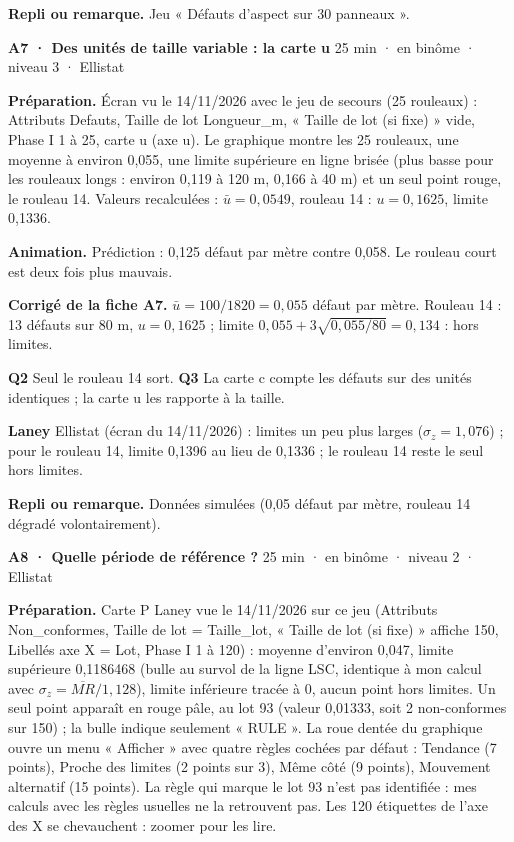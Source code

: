{\small\textbf{Repli ou remarque.} Jeu « Défauts d'aspect sur 30 panneaux ».}\par
\vspace{3pt}
\begin{tcolorbox}[act]\textbf{A7 · Des unités de taille variable : la carte u} \hfill {\small 25 min · en binôme · niveau 3 · Ellistat}\end{tcolorbox}
\textbf{Préparation.} Écran vu le 14/11/2026 avec le jeu de secours (25 rouleaux) : Attributs Defauts, Taille de lot Longueur\_m, « Taille de lot (si fixe) » vide, Phase I 1 à 25, carte u (axe u). Le graphique montre les 25 rouleaux, une moyenne à environ 0,055, une limite supérieure en ligne brisée (plus basse pour les rouleaux longs : environ 0,119 à 120 m, 0,166 à 40 m) et un seul point rouge, le rouleau 14. Valeurs recalculées : $\bar u = 0{,}0549$, rouleau 14 : $u = 0{,}1625$, limite 0,1336.\par
\textbf{Animation.} Prédiction : 0,125 défaut par mètre contre 0,058. Le rouleau court est deux fois plus mauvais.\par
\textbf{\color{ok}Corrigé de la fiche A7.} $\bar u = 100 / 1820 = 0{,}055$ défaut par mètre. Rouleau 14 : 13 défauts sur 80 m, $u = 0{,}1625$ ; limite $0{,}055 + 3\sqrt{0{,}055 / 80} = 0{,}134$ : hors limites.\par \textbf{Q2} Seul le rouleau 14 sort. \textbf{Q3} La carte c compte les défauts sur des unités identiques ; la carte u les rapporte à la taille.\par \textbf{Laney} Ellistat (écran du 14/11/2026) : limites un peu plus larges ($\sigma_z = 1{,}076$) ; pour le rouleau 14, limite 0,1396 au lieu de 0,1336 ; le rouleau 14 reste le seul hors limites.\par
{\small\textbf{Repli ou remarque.} Données simulées (0,05 défaut par mètre, rouleau 14 dégradé volontairement).}\par
\vspace{3pt}
\begin{tcolorbox}[act]\textbf{A8 · Quelle période de référence ?} \hfill {\small 25 min · en binôme · niveau 2 · Ellistat}\end{tcolorbox}
\textbf{Préparation.} Carte P Laney vue le 14/11/2026 sur ce jeu (Attributs Non\_conformes, Taille de lot = Taille\_lot, « Taille de lot (si fixe) » affiche 150, Libellés axe X = Lot, Phase I 1 à 120) : moyenne d'environ 0,047, limite supérieure 0,1186468 (bulle au survol de la ligne LSC, identique à mon calcul avec $\sigma_z = \overline{MR}/1{,}128$), limite inférieure tracée à 0, aucun point hors limites. Un seul point apparaît en rouge pâle, au lot 93 (valeur 0,01333, soit 2 non-conformes sur 150) ; la bulle indique seulement « RULE ». La roue dentée du graphique ouvre un menu « Afficher » avec quatre règles cochées par défaut : Tendance (7 points), Proche des limites (2 points sur 3), Même côté (9 points), Mouvement alternatif (15 points). La règle qui marque le lot 93 n'est pas identifiée : mes calculs avec les règles usuelles ne la retrouvent pas. Les 120 étiquettes de l'axe des X se chevauchent : zoomer pour les lire.\par
